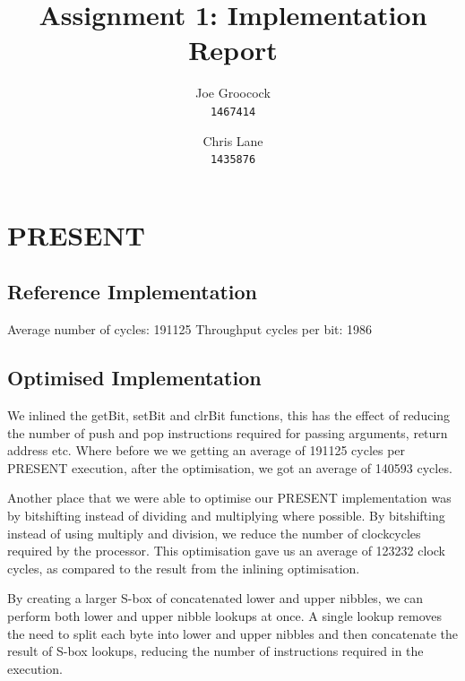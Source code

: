 \documentclass[11pt, a4paper]{article}
\title{Assignment 1: Implementation Report}
\author{Joe Groocock    \\ \texttt{\normalsize 1467414}
    \and Chris Lane     \\ \texttt{\normalsize 1435876}
}
\begin{document}
\maketitle

\section{PRESENT}\label{sec:present}
\subsection{Reference Implementation}\label{subsec:referenceImplementation}
Average number of cycles: 191125
Throughput cycles per bit: 1986

\subsection{Optimised Implementation}\label{subsec:optimisedImplementation}


We inlined the getBit, setBit and clrBit functions, this has the effect of reducing the number of push and pop instructions required for passing arguments, return address etc.
Where before we we getting an average of 191125 cycles per PRESENT execution, after the optimisation, we got an average of 140593 cycles.

Another place that we were able to optimise our PRESENT implementation was by bitshifting instead of dividing and multiplying where possible. By bitshifting instead of using multiply and division, we reduce the number of clockcycles required by the processor.
This optimisation gave us an average of 123232 clock cycles, as compared to the result from the inlining optimisation.

By creating a larger S-box of concatenated lower and upper nibbles, we can perform both lower and upper nibble lookups at once. A single lookup removes the need to split each byte into lower and upper nibbles and then concatenate the result of S-box lookups, reducing the number of instructions required in the execution.
\end{document}
